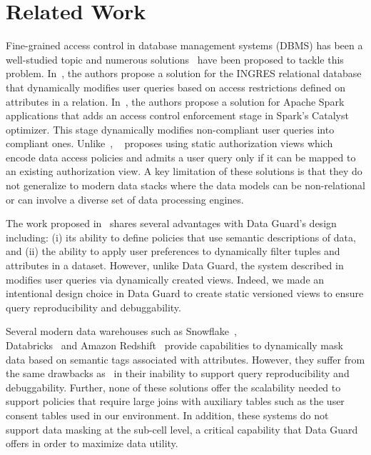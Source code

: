 \section{Related Work}
Fine-grained access control in database management systems (DBMS) has been a well-studied topic and numerous solutions~\cite{Stonebraker74, Rizvi04,Xue23, Agrawal05} have been proposed to tackle this problem. In~\cite{Stonebraker74}, the authors propose a solution for the INGRES relational database that dynamically modifies user queries based on access restrictions defined on attributes in a relation. In~\cite{Xue23}, the authors propose a solution for Apache Spark applications that adds an access control enforcement stage in Spark's Catalyst optimizer. This stage dynamically modifies non-compliant user queries into compliant ones. Unlike~\cite{Stonebraker74, Xue23}, ~\cite{Rizvi04} proposes using static authorization views which encode data access policies and admits a user query only if it can be mapped to an existing authorization view. A key limitation of these solutions is that they do not generalize to modern data stacks where the data models can be non-relational or can involve a diverse set of data processing engines. 

The work proposed in~\cite{Agrawal05} shares several advantages with Data Guard's design including: (i) its ability to define policies that use semantic descriptions of data, and 
(ii) the ability to apply user preferences to dynamically filter tuples and attributes in a dataset. However, unlike Data Guard, the system described in~\cite{Agrawal05}  modifies user queries via dynamically created views. Indeed, we made an intentional design choice in Data Guard to create static versioned views to ensure query reproducibility and debuggability. 

Several modern data warehouses such as Snowflake~\cite{Snowflake}, \\ Databricks~\cite{Databricks} and Amazon Redshift~\cite{Redshift} provide capabilities to dynamically mask data based on semantic tags associated with attributes. However, they suffer from the same drawbacks as~\cite{Agrawal05} in their inability to support query reproducibility and debuggability. Further, none of these solutions offer the scalability needed to support policies that require large joins with auxiliary tables such as the user consent tables used in our environment. In addition, these systems do not support data masking at the sub-cell level, a critical capability that Data Guard offers in order to maximize data utility.

